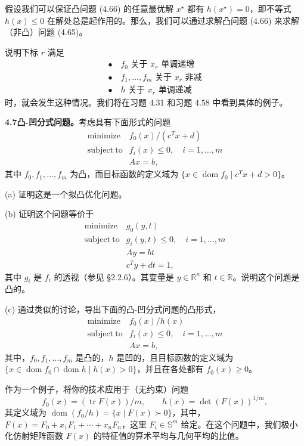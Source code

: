 \documentclass[UTF8,12pt,a4paper,fontset=fandol]{ctexart}
\begin{document}
假设我们可以保证凸问题 (4.66) 的任意最优解 $x^\star$ 都有 $h(x^\star)=0$，即不等式 $h(x)\leq0$ 在解处总是起作用的。那么，我们可以通过求解凸问题 (4.66) 来求解（非凸）问题 (4.65)。

说明下标 $r$ 满足
\[
\begin{array}{l}
\bullet\quad f_0\text{ 关于 }x_r\text{ 单调递增}\\
\bullet\quad f_1,\ldots,f_m\text{ 关于 }x_r\text{ 非减}\\
\bullet\quad h\text{ 关于 }x_r\text{ 单调递减}
\end{array}
\]
时，就会发生这种情况。我们将在习题 4.31 和习题 4.58 中看到具体的例子。

\noindent\textbf{4.7\quad 凸-凹分式问题。}\quad 考虑具有下面形式的问题
\[
\begin{array}{ll}
\mathop{\mathrm{minimize}} & f_0(x)/(c^Tx+d)\\
\mathrm{subject\ to} & f_i(x)\leq0,\quad i=1,\ldots,m\\
& Ax=b,
\end{array}
\]
其中 $f_0,f_1,\ldots,f_m$ 为凸，而目标函数的定义域为 $\{x\in\operatorname{dom} f_0\mid c^Tx+d>0\}$。

(a) 证明这是一个拟凸优化问题。

(b) 证明这个问题等价于
\[
\begin{array}{ll}
\mathop{\mathrm{minimize}} & g_0(y,t)\\
\mathrm{subject\ to} & g_i(y,t)\leq0,\quad i=1,\ldots,m\\
& Ay=bt\\
& c^Ty+dt=1,
\end{array}
\]
其中 $g_i$ 是 $f_i$ 的透视（参见 \S2.2.6）。其变量是 $y\in\mathbb{R}^n$ 和 $t\in\mathbb{R}$。说明这个问题是凸的。

(c) 通过类似的讨论，导出下面的凸-凹分式问题的凸形式，
\[
\begin{array}{ll}
\mathop{\mathrm{minimize}} & f_0(x)/h(x)\\
\mathrm{subject\ to} & f_i(x)\leq0,\quad i=1,\ldots,m\\
& Ax=b,
\end{array}
\]
其中，$f_0,f_1,\ldots,f_m$ 是凸的，$h$ 是凹的，且目标函数的定义域为 $\{x\in\operatorname{dom} f_0\cap\operatorname{dom} h\mid h(x)>0\}$，并且在各处都有 $f_0(x)\geq0$。

作为一个例子，将你的技术应用于（无约束）问题
\[
f_0(x)=(\operatorname{tr}F(x))/m,\qquad h(x)=\det(F(x))^{1/m},
\]
其定义域为 $\operatorname{dom}(f_0/h)=\{x\mid F(x)\succ0\}$，其中，$F(x)=F_0+x_1F_1+\cdots+x_nF_n$，这里 $F_i\in\mathbb{S}^m$ 给定。在这个问题中，我们极小化仿射矩阵函数 $F(x)$ 的特征值的算术平均与几何平均的比值。
\end{document}
